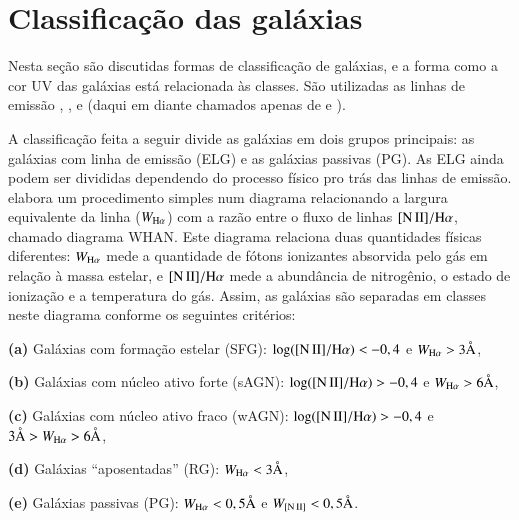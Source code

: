 
\section{Classificação das galáxias}

Nesta seção são discutidas formas de classificação de galáxias, e a forma como a
cor UV das galáxias está relacionada às classes. São utilizadas as linhas de
emissão \Halpha, \Hbeta, \NII e \OIII (daqui em diante chamados apenas de \nII e
\oIII).

A classificação feita a seguir divide as galáxias em dois grupos principais: as
galáxias com linha de emissão (ELG) e as galáxias passivas (PG). As ELG ainda
podem ser divididas dependendo do processo físico pro trás das linhas de
emissão. \citet{CidFernandes2011} elabora um procedimento simples num diagrama
relacionando a largura equivalente da linha \Halpha ($W_{\mathrm{H}\alpha}$) com a razão entre o
fluxo de linhas $\nII/\Halpha$, chamado diagrama WHAN. Este diagrama relaciona
duas quantidades físicas diferentes: $W_{\mathrm{H}\alpha}$ mede a quantidade de fótons
ionizantes absorvida pelo gás em relação à massa estelar, e $\nII/\Halpha$ mede
a abundância de nitrogênio, o estado de ionização e a temperatura do gás. Assim,
as galáxias são separadas em classes neste diagrama conforme os seguintes
critérios:

\begin{list}{}{\setlength\itemsep{0pt}}
\item \textbf{(a)} Galáxias com formação estelar (SFG): $\log(\nII/\Halpha) <
-0,4$ e $W_{\mathrm{H}\alpha} > 3\text{\AA}$,
\item \textbf{(b)} Galáxias com núcleo ativo forte (sAGN): $\log(\nII/\Halpha) >
-0,4$ e $W_{\mathrm{H}\alpha} > 6\text{\AA}$,
\item \textbf{(c)} Galáxias com núcleo ativo fraco (wAGN): $\log(\nII/\Halpha) >
-0,4$ e $3\text{\AA} > W_{\mathrm{H}\alpha} > 6\text{\AA}$,
\item \textbf{(d)} Galáxias ``aposentadas'' (RG): $W_{\mathrm{H}\alpha} < 3\text{\AA}$,
\item \textbf{(e)} Galáxias passivas (PG): $W_{\mathrm{H}\alpha} < 0,5\text{\AA}$ e $W_{\mathrm{[N\,II]}} <
0,5\text{\AA}$.
\end{list}

